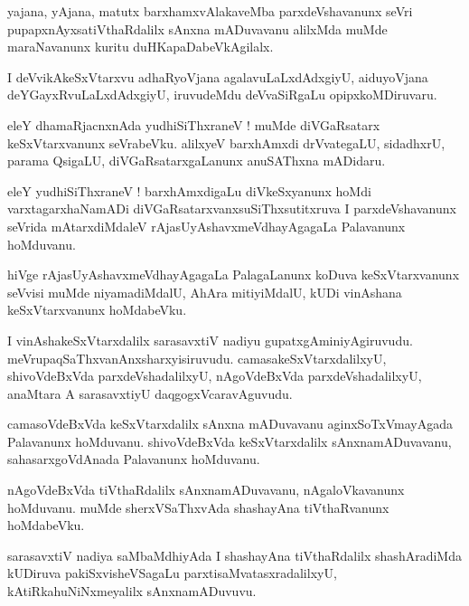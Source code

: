 \documentclass{article}
\begin{document}
\begin{mn}
yajana, yAjana, matutx barxhamxvAlakaveMba parxdeVshavanunx seVri pupapxnAyxsatiVthaRdalilx sAnxna
mADuvavanu alilxMda muMde maraNavanunx kuritu duHKapaDabeVkAgilalx.
\end{mn}

\begin{mn}
I deVvikAkeSxVtarxvu adhaRyoVjana agalavuLaLxdAdxgiyU, aiduyoVjana deYGayxRvuLaLxdAdxgiyU, 
iruvudeMdu deVvaSiRgaLu opipxkoMDiruvaru.
\end{mn}

\begin{mn}
eleY dhamaRjacnxnAda yudhiSiThxraneV ! muMde diVGaRsatarx keSxVtarxvanunx seVrabeVku.
alilxyeV barxhAmxdi drVvategaLU, sidadhxrU, parama QsigaLU, diVGaRsatarxgaLanunx anuSAThxna 
mADidaru.
\end{mn}

\begin{mn}
eleY yudhiSiThxraneV ! barxhAmxdigaLu diVkeSxyanunx hoMdi varxtagarxhaNamADi 
diVGaRsatarxvanxsuSiThxsutitxruva I parxdeVshavanunx seVrida mAtarxdiMdaleV 
rAjasUyAshavxmeVdhayAgagaLa Palavanunx hoMduvanu.

\end{mn}

\begin{mn}
hiVge rAjasUyAshavxmeVdhayAgagaLa PalagaLanunx koDuva keSxVtarxvanunx seVvisi muMde niyamadiMdalU, 
AhAra mitiyiMdalU, kUDi vinAshana keSxVtarxvanunx hoMdabeVku.
\end{mn}

\begin{mn}
I vinAshakeSxVtarxdalilx sarasavxtiV nadiyu gupatxgAminiyAgiruvudu. 
meVrupaqSaThxvanAnxsharxyisiruvudu. camasakeSxVtarxdalilxyU, shivoVdeBxVda parxdeVshadalilxyU, 
nAgoVdeBxVda parxdeVshadalilxyU, anaMtara A sarasavxtiyU daqgogxVcaravAguvudu.
\end{mn}

\begin{mn}
camasoVdeBxVda keSxVtarxdalilx sAnxna mADuvavanu aginxSoTxVmayAgada Palavanunx hoMduvanu.
shivoVdeBxVda keSxVtarxdalilx sAnxnamADuvavanu, sahasarxgoVdAnada Palavanunx hoMduvanu.
\end{mn}

\begin{mn}
nAgoVdeBxVda tiVthaRdalilx sAnxnamADuvavanu, nAgaloVkavanunx hoMduvanu. muMde sherxVSaThxvAda 
shashayAna tiVthaRvanunx hoMdabeVku.
\end{mn}

\begin{mn}
sarasavxtiV nadiya saMbaMdhiyAda I shashayAna tiVthaRdalilx shashAradiMda kUDiruva 
pakiSxvisheVSagaLu parxtisaMvatasxradalilxyU, kAtiRkahuNiNxmeyalilx sAnxnamADuvuvu.
\end{mn}
\end{document}

